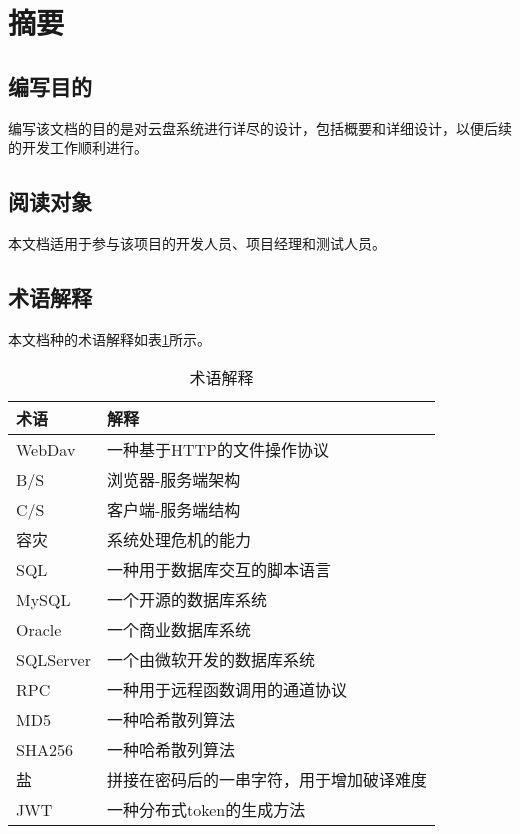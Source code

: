 \section{摘要}

\subsection{编写目的}

编写该文档的目的是对云盘系统进行详尽的设计，包括概要和详细设计，以便后续的开发工作顺利进行。

\subsection{阅读对象}

本文档适用于参与该项目的开发人员、项目经理和测试人员。

\subsection{术语解释}

本文档种的术语解释如表\ref{tab:explain}所示。

\begin{table}[H]
    \caption{术语解释}
    \label{tab:explain}
    \centering
    \begin{tabular}{|l|l|}
        \hline
        术语 & 解释 \\
        \hline
        WebDav & 一种基于HTTP的文件操作协议 \\
        B/S & 浏览器-服务端架构 \\
        C/S & 客户端-服务端结构 \\
        容灾 & 系统处理危机的能力 \\
        SQL & 一种用于数据库交互的脚本语言 \\
        MySQL & 一个开源的数据库系统 \\
        Oracle & 一个商业数据库系统 \\
        SQLServer & 一个由微软开发的数据库系统 \\
        RPC & 一种用于远程函数调用的通道协议 \\
        MD5 & 一种哈希散列算法 \\
        SHA256 & 一种哈希散列算法 \\
        盐 & 拼接在密码后的一串字符，用于增加破译难度 \\
        JWT & 一种分布式token的生成方法 \\
        \hline
    \end{tabular}
\end{table}